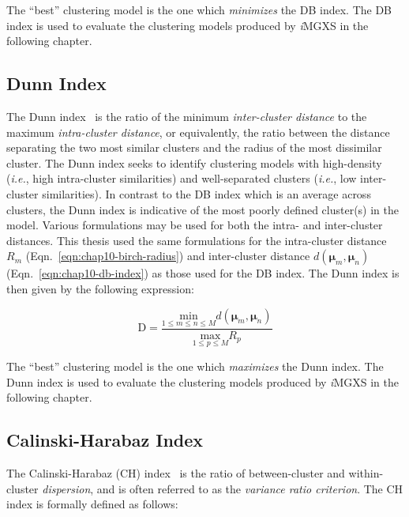 The ``best'' clustering model is the one which \textit{minimizes} the DB index. The DB index is used to evaluate the clustering models produced by \textit{i}\ac{MGXS} in the following chapter.
  
\subsection{Dunn Index}
\label{subsec:chap10-dunn-index}

The Dunn index~\cite{dunn1974index} is the ratio of the minimum \textit{inter-cluster distance} to the maximum \textit{intra-cluster distance}, or equivalently, the ratio between the distance separating the two most similar clusters and the radius of the most dissimilar cluster. The Dunn index seeks to identify clustering models with high-density (\textit{i.e.}, high intra-cluster similarities) and well-separated clusters (\textit{i.e.}, low inter-cluster similarities). In contrast to the DB index which is an average across clusters, the Dunn index is indicative of the most poorly defined cluster(s) in the model. Various formulations may be used for both the intra- and inter-cluster distances. This thesis used the same formulations for the intra-cluster distance $R_{m}$ (Eqn.~\ref{eqn:chap10-birch-radius}) and inter-cluster distance $d\left(\boldsymbol{\mu}_{m},\boldsymbol{\mu}_{n}\right)$ (Eqn.~\ref{eqn:chap10-db-index}) as those used for the DB index. The Dunn index is then given by the following expression:

\begin{equation}
\label{eqn:chap10-dunn-index}
\textrm{D} = \frac{\underset{{1 \le m \le n \le M}}{\textrm{min}} d(\boldsymbol{\mu}_{m},\boldsymbol{\mu}_{n})}{\underset{{1 \le p \le M}}{\textrm{max}} R_{p}}
\end{equation}

The ``best'' clustering model is the one which \textit{maximizes} the Dunn index. The Dunn index is used to evaluate the clustering models produced by \textit{i}\ac{MGXS} in the following chapter.

\subsection{Calinski-Harabaz Index}
\label{subsec:chap10-calinski-harabaz}

The Calinski-Harabaz (CH) index~\cite{calinski1974dendrite} is the ratio of between-cluster and within-cluster \textit{dispersion}, and is often referred to as the \textit{variance ratio criterion}. The CH index is formally defined as follows:

